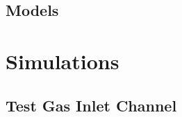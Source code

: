 \documentclass[12pt,a4paper]{report}
\begin{document}
\subsection{Models}

\newpage
\section{Simulations}
\subsection{Test Gas Inlet Channel}

%
%
%
%
%
%
%
%
%
\end{document}
